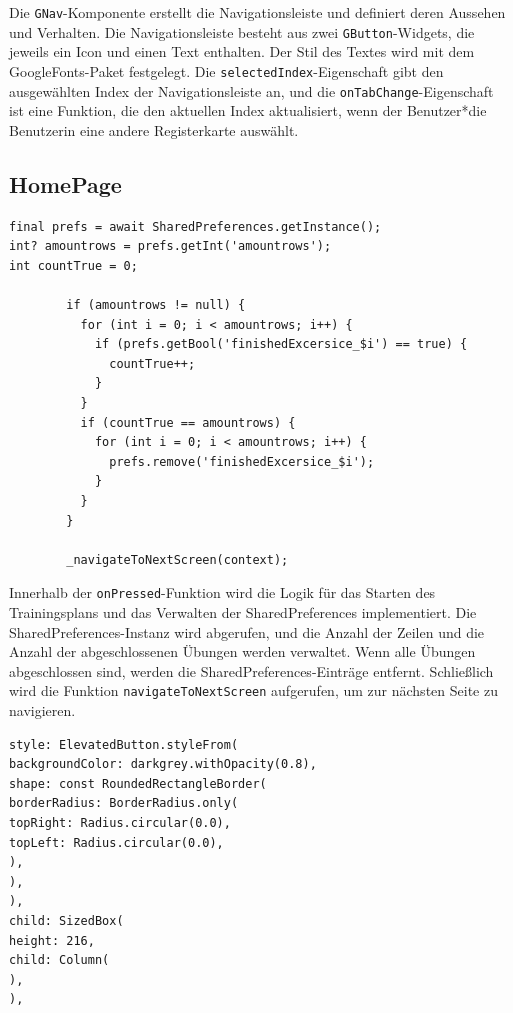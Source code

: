     Die \texttt{GNav}-Komponente erstellt die Navigationsleiste und definiert deren Aussehen und Verhalten. Die Navigationsleiste besteht aus zwei \texttt{GButton}-Widgets, die jeweils ein Icon und einen Text enthalten. Der Stil des Textes wird mit dem GoogleFonts-Paket festgelegt. Die \texttt{selectedIndex}-Eigenschaft gibt den ausgewählten Index der Navigationsleiste an, und die \texttt{onTabChange}-Eigenschaft ist eine Funktion, die den aktuellen Index aktualisiert, wenn der Benutzer*die Benutzerin eine andere Registerkarte auswählt.
    

    \subsection{HomePage}
    \author{Antonio Kuvac}

\begin{lstlisting}[caption=Trainingsplan Logik,label=lst:impl:frontend:qrcode]
final prefs = await SharedPreferences.getInstance();
int? amountrows = prefs.getInt('amountrows');
int countTrue = 0;

        if (amountrows != null) {
          for (int i = 0; i < amountrows; i++) {
            if (prefs.getBool('finishedExcersice_$i') == true) {
              countTrue++;
            }
          }
          if (countTrue == amountrows) {
            for (int i = 0; i < amountrows; i++) {
              prefs.remove('finishedExcersice_$i');
            }
          }
        }

        _navigateToNextScreen(context);
\end{lstlisting}

Innerhalb der \texttt{onPressed}-Funktion wird die Logik für das Starten des Trainingsplans und das Verwalten der SharedPreferences implementiert. Die SharedPreferences-Instanz wird abgerufen, und die Anzahl der Zeilen und die Anzahl der abgeschlossenen Übungen werden verwaltet. Wenn alle Übungen abgeschlossen sind, werden die SharedPreferences-Einträge entfernt. Schließlich wird die Funktion \texttt{navigateToNextScreen} aufgerufen, um zur nächsten Seite zu navigieren.
\\

\begin{lstlisting}[caption=Trainingsplan starten Knopf,label=lst:impl:frontend:qrcode]
style: ElevatedButton.styleFrom(
backgroundColor: darkgrey.withOpacity(0.8),
shape: const RoundedRectangleBorder(
borderRadius: BorderRadius.only(
topRight: Radius.circular(0.0),
topLeft: Radius.circular(0.0),
),
),
),
child: SizedBox(
height: 216,
child: Column(
),
),
\end{lstlisting}


